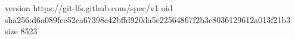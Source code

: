 version https://git-lfs.github.com/spec/v1
oid sha256:d6a089fee52ca67398e42bffd920da5e22564867f2b3c8036129612a013f21b3
size 8523
